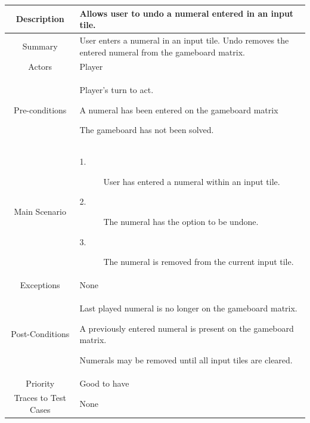 \documentclass[12pt]{article}
\begin{document}
\begin{table}[htbp]
\begin{center}
\begin{tabular}{| c | m{10cm} |}
\hline
\cellcolor{lightgray}Description & Allows user to undo a numeral entered in an input tile. \\
\hline
\cellcolor{lightgray}Summary & User enters a numeral in an input tile. Undo removes the entered numeral from the gameboard matrix. \\
\hline
\cellcolor{lightgray}Actors & Player \\
\hline
\cellcolor{lightgray}Pre-conditions &
\begin{description}[font=$\bullet$~\normalfont\scshape]
\item Player's turn to act.
\item A numeral has been entered on the gameboard matrix 
\item The gameboard has not been solved.
\end{description}\\
\hline
\cellcolor{lightgray}Main Scenario & 
\begin{description}
\item [1.]User has entered a numeral within an input tile.
\item [2.]The numeral has the option to be undone.
\item [3.]The numeral is removed from the current input tile.
\end{description}\\
\hline
\cellcolor{lightgray}Exceptions & None \\
\hline
\cellcolor{lightgray}Post-Conditions & 
\begin{description}[font=$\bullet$~\normalfont\scshape]
\item Last played numeral is no longer on the gameboard matrix.
\item A previously entered numeral is present on the gameboard matrix.
\item Numerals may be removed until all input tiles are cleared.
\end{description}\\
\hline
\cellcolor{lightgray}Priority & Good to have \\
\hline
\cellcolor{lightgray}Traces to Test Cases & None \\
\hline
\end{tabular}
\end{center}
\end{table}
\end{document}

